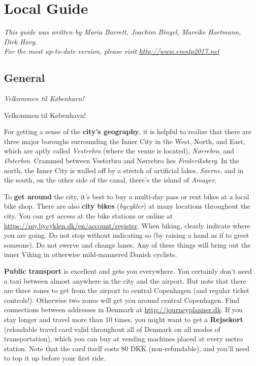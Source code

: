 

\chapter{Local Guide}


\emph{This guide was written by Maria Barrett, Joachim Bingel, Mareike Hartmann, Dirk Hovy.\\
\noindent For the most up-to-date version, please visit
  \url{http://www.emnlp2017.net}}
  



\section{General}
\textit{Velkommen til København!}

Velkommen til København!

For getting a sense of the \textbf{city’s geography}, it is helpful to realize that there are three major boroughs surrounding the Inner City in the West, North, and East, which are aptly called \textit{Vesterbro} (where the venue is located), \textit{Nørrebro}, and \textit{Østerbro}. Crammed between Vesterbro and Nørrebro lies \textit{Frederiksberg}. In the north, the Inner City is walled off by a stretch of artificial lakes, \textit{Søerne}, and in the south, on the other side of the canal, there’s the island of \textit{Amager}.

To \textbf{get around} the city, it's best to buy a multi-day pass or rent bikes at a local bike shop. There are also \textbf{city bikes} (\textit{bycykler}) at many locations throughout the city. You can get access at the bike stations or online at \url{https://my.bycyklen.dk/en/account/register}.
When biking, clearly indicate where you are going. Do not stop without indicating so (by raising a hand as if to greet someone). Do not swerve and change lanes. Any of these things will bring out the inner Viking in otherwise mild-mannered Danish cyclists.

\textbf{Public transport} is excellent and gets you everywhere. You certainly don’t need a taxi between almost anywhere in the city and the airport. But note that there are three zones to get from the airport to central Copenhagen (and regular ticket controls!). Otherwise two zones will get you around central Copenhagen. Find connections between addresses in Denmark at \url{http://journeyplanner.dk}. If you stay longer and travel more than 10 times, you might want to get a \textbf{Rejsekort} (reloadable travel card valid throughout all of Denmark on all modes of transportation), which you can buy at vending machines placed at every metro station. Note that the card itself costs 80 DKK (non-refundable), and you’ll need to top it up before your first ride.

